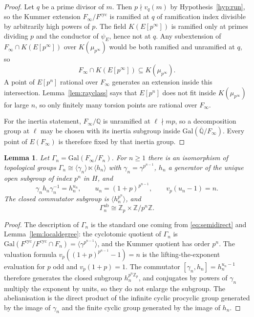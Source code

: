 \documentclass[11pt]{article}
\newtheorem{lemma}[theorem]{Lemma}
\theoremstyle{definition}
\theoremstyle{remark}
\newcommand{\Z}{\mathbb{Z}}
\newcommand{\Q}{\mathbb{Q}}
\newcommand{\Gal}{\mathrm{Gal}}
\newcommand{\cyc}{\mathrm{cyc}}
\begin{document}
\begin{proof}
Let \(q\) be a prime divisor of \(m\). Then \(p\nmid v_q(m)\) by Hypothesis~\ref{hyp:run}, so the Kummer extension \(F_\infty/F^{\cyc}\) is ramified at \(q\) of ramification index divisible by arbitrarily high powers of \(p\). The field \(K(E[p^\infty])\) is ramified only at primes dividing \(p\) and the conductor of \(\psi_E\), hence not at \(q\). Any subextension of \(F_\infty\cap K(E[p^\infty])\) over \(K(\mu_{p^\infty})\) would be both ramified and unramified at \(q\), so
\[
F_\infty\cap K(E[p^\infty])\subseteq K(\mu_{p^\infty}).
\]
A point of \(E[p^n]\) rational over \(F_\infty\) generates an extension inside this intersection. Lemma~\ref{lem:rayclass} says that \(E[p^n]\) does not fit inside \(K(\mu_{p^\infty})\) for large \(n\), so only finitely many torsion points are rational over \(F_\infty\).

For the inertia statement, \(F_\infty/\Q\) is unramified at \(\ell\nmid mp\), so a decomposition group at \(\ell\) may be chosen with its inertia subgroup inside \(\Gal(\overline{\Q}/F_\infty)\). Every point of \(E(F_\infty)\) is therefore fixed by that inertia group.
\end{proof}

\begin{lemma}
\label{lem:ab}
Let \(\Gamma_n=\Gal(F_\infty/F_n)\). For \(n\ge 1\) there is an isomorphism of topological groups \(\Gamma_n\cong\langle\gamma_n\rangle\ltimes\langle h_n\rangle\) with \(\gamma_n=\gamma^{p^{n-1}}\), \(h_n\) a generator of the unique open subgroup of index \(p^n\) in \(H\), and
\[
\gamma_n h_n\gamma_n^{-1}=h_n^{u_n},\qquad u_n=(1+p)^{p^{n-1}},\qquad v_p(u_n-1)=n.
\]
The closed commutator subgroup is \(\langle h_n^{p^n}\rangle\), and
\[
\Gamma_n^{\mathrm{ab}}\cong\Z_p\times\Z/p^n\Z.
\]
\end{lemma}

\begin{proof}
The description of \(\Gamma_n\) is the standard one coming from \eqref{eq:semidirect} and Lemma~\ref{lem:localdegree}: the cyclotomic quotient of \(\Gamma_n\) is \(\Gal(F^{\cyc}/F^{\cyc}\cap F_n)=\langle\gamma^{p^{n-1}}\rangle\), and the Kummer quotient has order \(p^n\). The valuation formula \(v_p((1+p)^{p^{n-1}}-1)=n\) is the lifting-the-exponent evaluation for \(p\) odd and \(v_p(1+p)=1\). The commutator \([\gamma_n,h_n]=h_n^{u_n-1}\) therefore generates the closed subgroup \(h_n^{p^n\Z_p}\), and conjugates by powers of \(\gamma_n\) multiply the exponent by units, so they do not enlarge the subgroup. The abelianisation is the direct product of the infinite cyclic procyclic group generated by the image of \(\gamma_n\) and the finite cyclic group generated by the image of \(h_n\).
\end{proof}
\end{document}
